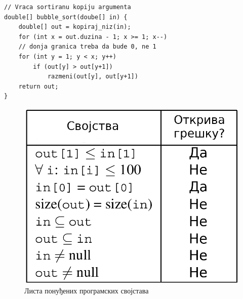 \documentclass[a4paper]{article}
\begin{document}
{\begin{verbatim}
// Vraca sortiranu kopiju argumenta
double[] bubble_sort(doube[] in) {
    double[] out = kopiraj_niz(in);
    for (int x = out.duzina - 1; x >= 1; x--)
    // donja granica treba da bude 0, ne 1
    for (int y = 1; y < x; y++)
        if (out[y] > out[y+1])
            razmeni(out[y], out[y+1])
    return out;
}
\end{verbatim}



\begin{figure}[h!]
\begin{center}
\includegraphics[scale=0.16]{./slike/latent_examples.png}
\end{center}
    \caption{Листа понуђених програмских својстава}
\label{fig:latent_example}
\end{figure}

}
\end{document}
